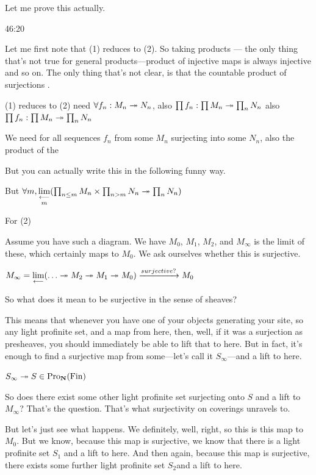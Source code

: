 Let me prove this actually.
\begin{unfinished}{46:20}

\begin{sketch}
Let me first note that (1) reduces to (2). So taking products --- the only thing that's not true for general products---product of injective maps is always injective and so on. The only thing that's not clear, is that the countable product of surjections .

(1) reduces to (2) need $\forall f_n: M_n \twoheadrightarrow N_n$, also $\prod f_n: \prod M_n \twoheadrightarrow \prod_n N_n$
also $\prod f_n: \prod M_n \twoheadrightarrow \prod_n N_n$ %

We need for all sequences $f_n$ from some $M_n$ surjecting into some $N_n$, also the product of the 

But you can actually write this in the following funny way.

But $\forall m, \mathop{\operatorname*{lim}\limits_{\longleftarrow}}\limits_{m} ( \prod_{n \leq m} M_n \times \prod_{n > m} N_n \twoheadrightarrow \prod_n N_n )$

For (2)

Assume you have such a diagram. We have $M_0$, $M_1$, $M_2$, and $M_\infty$ is the limit of these, which certainly maps to $M_0$. We ask ourselves whether this is surjective. 

$ M_\infty = \lim ( \dots \epi M_2 \epi M_1 \epi M_0 ) \xrightarrow{surjective?} M_0$

So what does it mean to be surjective in the sense of sheaves?


This means that whenever you have one of your objects generating your site, so any light profinite set, and a map from here, then, well, if it was a surjection as presheaves, you should immediately be able to lift that to here. But in fact, it's enough to find a surjective map from some---let's call it $S_\infty$---and a lift to here. 

$ S_\infty \twoheadrightarrow S \in \operatorname{Pro}_{\mathbf N}(\operatorname{Fin}) $

So does there exist some other light profinite set surjecting onto $S$ and a lift to $M_\infty$? That's the question. That's what surjectivity on coverings unravels to.

But let's just see what happens. We definitely, well, right, so this is this map to $M_0$. But we know, because this map is surjective, we know that there is a light profinite set $S_1$ and a lift to here. And then again, because this map is surjective, there exists some further light profinite set $S_2$and a lift to here.


\end{sketch}
\end{unfinished}
